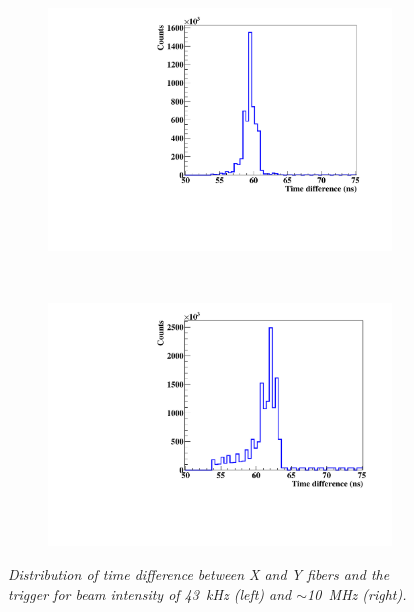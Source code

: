 \documentclass[a4paper,11pt]{article}
\begin{document}
\begin{figure}[htb]
\centering
    \begin{subfigure}{0.49\textwidth} \centering \includegraphics[width=\textwidth]{figures/time_coinc_43kHz_August.pdf} \caption{} \label{fig:Time_43kHz}
    \end{subfigure}
    ~
    \begin{subfigure}{0.49\textwidth} \centering \includegraphics[width=\textwidth]{figures/time_coinc_10MHz_August.pdf} \caption{} \label{fig:Time_10MHz}
    \end{subfigure}
\caption{\small{\textit{Distribution of time difference between X and Y fibers and the trigger for beam intensity of 43~kHz (left) and $\sim$10~MHz (right).}}}
\label{fig:Time_coinc}
\end{figure}
\end{document}
